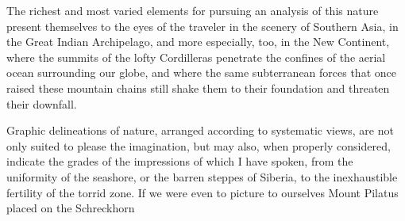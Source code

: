The richest and most varied elements for pursuing an analysis of this nature present themselves to the eyes of the traveler in the scenery of Southern Asia, in the Great Indian Archipelago, and more especially, too, in the New Continent, where the summits of the lofty Cordilleras penetrate the confines of the aerial ocean surrounding our globe, and where the same subterranean forces that once raised these mountain chains still shake them to their foundation and threaten their downfall.

Graphic delineations of nature, arranged according to systematic views, are not only suited to please the imagination, but may also, when properly considered, indicate the grades of the impressions of which I have spoken, from the uniformity of the seashore, or the barren steppes of Siberia, to the inexhaustible fertility of the torrid zone. If we were even to picture to ourselves Mount Pilatus placed on the Schreckhorn
